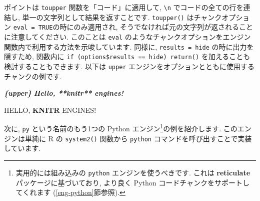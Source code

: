 \documentclass[
  11pt,
  lualatex,
  ja=standard]{bxjsreport}
\newenvironment{Shaded}{\begin{snugshade}}{\end{snugshade}}
\newcommand{\AttributeTok}[1]{\textcolor[rgb]{0.77,0.63,0.00}{#1}}
\newcommand{\ConstantTok}[1]{\textcolor[rgb]{0.00,0.00,0.00}{#1}}
\newcommand{\ControlFlowTok}[1]{\textcolor[rgb]{0.13,0.29,0.53}{\textbf{#1}}}
\newcommand{\FunctionTok}[1]{\textcolor[rgb]{0.00,0.00,0.00}{#1}}
\newcommand{\InformationTok}[1]{\textcolor[rgb]{0.56,0.35,0.01}{\textbf{\textit{#1}}}}
\newcommand{\NormalTok}[1]{#1}
\newcommand{\OtherTok}[1]{\textcolor[rgb]{0.56,0.35,0.01}{#1}}
\newcommand{\SpecialCharTok}[1]{\textcolor[rgb]{0.00,0.00,0.00}{#1}}
\newcommand{\StringTok}[1]{\textcolor[rgb]{0.31,0.60,0.02}{#1}}
\renewenvironment{quote}{\def\FrameCommand{{\color{quotebarcolor}{\vrule width 3pt}}\hspace{10pt}}\MakeFramed{\advance\hsize-\width\FrameRestore}}{\endMakeFramed}
\begin{document}
ポイントは \texttt{toupper} 関数を「コード」に適用して, \texttt{\textbackslash{}n} でコードの全ての行を連結し, 単一の文字列として結果を返すことです. \texttt{toupper()} はチャンクオプション \texttt{eval = TRUE}の時にのみ適用され, そうでなければ元の文字列が返されることに注意してください. このことは \texttt{eval} のようなチャンクオプションをエンジン関数内で利用する方法を示唆しています. 同様に, \texttt{results = \textquotesingle{}hide\textquotesingle{}} の時に出力を隠すため, 関数内に \texttt{if (options\$results == \textquotesingle{}hide\textquotesingle{})\ return()} を加えることも検討することもできます. 以下は \texttt{upper} エンジンをオプションとともに使用するチャンクの例です.

\begin{quote}
\begin{Shaded}
\begin{Highlighting}[]
\InformationTok{\textasciigrave{}\textasciigrave{}\textasciigrave{}\{upper\}}
\InformationTok{Hello, **knitr** engines!}
\InformationTok{\textasciigrave{}\textasciigrave{}\textasciigrave{}}
\end{Highlighting}
\end{Shaded}

HELLO, \textbf{KNITR} ENGINES!
\end{quote}

次に, \texttt{py} という名前のもう1つの Python エンジン\footnote{実用的には組み込みの \texttt{python} エンジンを使うべきです. これは \textbf{reticulate} パッケージに基づいており, より良く Python コードチャンクをサポートしてくれます (\ref{eng-python}節参照).}の例を紹介します. このエンジンは単純に R の \texttt{system2()} 関数から \texttt{python} コマンドを呼び出すことで実装しています.

\begin{Shaded}
\end{Shaded}
\end{document}
